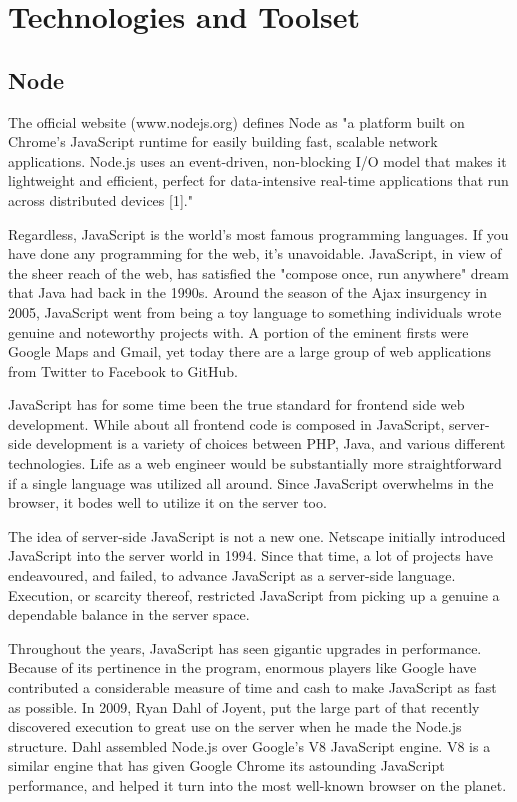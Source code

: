 \documentclass[../thesis.tex]{subfiles}
\begin{document}
\section{Technologies and Toolset}

\subsection{Node}
The official website (www.nodejs.org) defines Node as "a platform built on Chrome's JavaScript runtime for easily building fast, scalable network applications. Node.js uses an event-driven, non-blocking I/O model that makes it lightweight and efficient, perfect for data-intensive real-time applications that run across distributed devices [1]."
\linebreak

Regardless, JavaScript is the world's most famous programming languages. If you have done any programming for the web, it's unavoidable. JavaScript, in view of the sheer reach of the web, has satisfied the "compose once, run anywhere" dream that Java had back in the 1990s.  
Around the season of the Ajax insurgency in 2005, JavaScript went from being a toy language to something individuals wrote genuine and noteworthy projects with. A portion of the eminent firsts were Google Maps and Gmail, yet today there are a large group of web applications from Twitter to Facebook to GitHub.
\linebreak

JavaScript has for some time been the true standard for frontend side web development. While about all frontend code is composed in JavaScript, server-side development is a variety of choices between PHP, Java, and various different technologies. Life as a web engineer would be substantially more straightforward if a single language was utilized all around. Since JavaScript overwhelms in the browser, it bodes well to utilize it on the server too. 
\linebreak

The idea of server-side JavaScript is not a new one. Netscape initially introduced JavaScript into the server world in 1994. Since that time, a lot of projects have endeavoured, and failed, to advance JavaScript as a server-side language. Execution, or scarcity thereof, restricted JavaScript from picking up a genuine a dependable balance in the server space. 
\linebreak

Throughout the years, JavaScript has seen gigantic upgrades in performance. Because of its pertinence in the program, enormous players like Google have contributed a considerable measure of time and cash to make JavaScript as fast as possible. In 2009, Ryan Dahl of Joyent, put the large part of that recently discovered execution to great use on the server when he made the Node.js structure. Dahl assembled Node.js over Google's V8 JavaScript engine. V8 is a similar engine that has given Google Chrome its astounding JavaScript performance, and helped it turn into the most well-known browser on the planet.
\newpage
\end{document}
